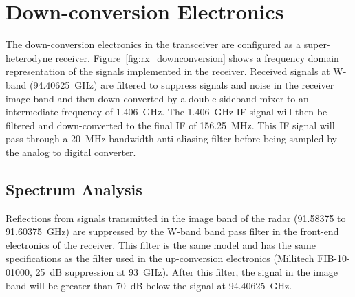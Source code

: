 \documentclass[12pt,letterpaper]{article}
\begin{document}
\section{Down-conversion Electronics}
\label{sec:receiver}

The down-conversion electronics in the transceiver are configured as a
super-heterodyne receiver. Figure~\ref{fig:rx_downconversion} shows a
frequency domain representation of the signals implemented in the
receiver. Received signals at W-band (94.40625~GHz) are filtered to
suppress signals and noise in the receiver image band and then
down-converted by a double sideband mixer to an intermediate frequency
of 1.406~GHz. The 1.406~GHz IF signal will then be filtered and
down-converted to the final IF of 156.25~MHz. This IF signal will pass
through a 20~MHz bandwidth anti-aliasing filter before being sampled
by the analog to digital converter.


\subsection{Spectrum Analysis}

Reflections from signals transmitted in the image band of the radar
(91.58375 to 91.60375~GHz) are suppressed by the W-band band pass
filter in the front-end electronics of the receiver. This filter is
the same model and has the same specifications as the filter used in
the up-conversion electronics (Millitech FIB-10-01000, 25~dB
suppression at 93~GHz). After this filter, the signal in the image
band will be greater than 70~dB below the signal at 94.40625~GHz.
\end{document}
